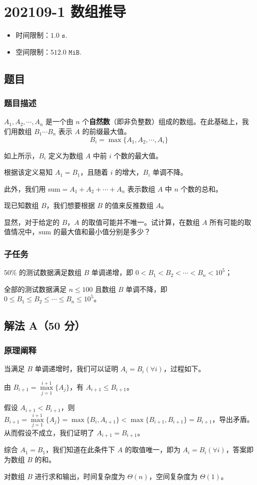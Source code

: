 \section{202109-1 数组推导}
\begin{itemize}
	\item 时间限制：$1.0\texttt{ s}$.
	\item 空间限制：$512.0\texttt{ MiB}$.
\end{itemize}
\subsection{题目}
\subsubsection{题目描述}
\par $A_1, A_2, \cdots, A_n$ 是一个由 $n$ 个\textbf{自然数}（即非负整数）组成的数组。在此基础上，我们用数组 $B_1 \cdots B_n$ 表示 $A$ 的前缀最大值。
$$B_i=\max\{A_1,A_2,\cdots,A_i\}$$
\par 如上所示，$B_i$ 定义为数组 $A$ 中前 $i$ 个数的最大值。
\par 根据该定义易知 $A_1=B_1$，且随着 $i$ 的增大，$B_i$ 单调不降。
\par 此外，我们用 $\text{sum}=A_1+A_2+\cdots+A_n$ 表示数组 $A$ 中 $n$ 个数的总和。
\par 现已知数组 $B$，我们想要根据 $B$ 的值来反推数组 $A$。
\par 显然，对于给定的 $B$，$A$ 的取值可能并不唯一。试计算，在数组 $A$ 所有可能的取值情况中，$\text{sum}$ 的最大值和最小值分别是多少？
\subsubsection{子任务}
\par $50\%$ 的测试数据满足数组 $B$ 单调递增，即 $0<B_1<B_2<\cdots<B_n<10^5$；
\par 全部的测试数据满足 $n\leq 100$ 且数组 $B$ 单调不降，即 $0\leq B_1\leq B_2\leq\cdots\leq B_n\leq 10^5$。
\subsection{解法 A（50 分）}
\subsubsection{原理阐释}
\par 当满足 $B$ 单调递增时，我们可以证明 $A_i=B_i(\forall i)$，过程如下。
\par 由 $B_{i+1}=\max\limits_{j=1}^{i+1}\{A_j\}$，有 $A_{i+1}\leq B_{i+1}$。
\par 假设 $A_{i+1}<B_{i+1}$，则 $B_{i+1}=\max\limits_{j=1}^{i+1}\{A_j\}=\max\{B_i,A_{i+1}\}<\max\{B_{i+1},B_{i+1}\}=B_{i+1}$，导出矛盾。从而假设不成立，我们证明了 $A_{i+1}=B_{i+1}$。
\par 综合 $A_1=B_1$，我们知道在此条件下 $A$ 的取值唯一，即为 $A_i=B_i(\forall i)$，答案即为数组 $B$ 的和。
\par 对数组 $B$ 进行求和输出，时间复杂度为 $\Theta(n)$，空间复杂度为 $\Theta(1)$。
